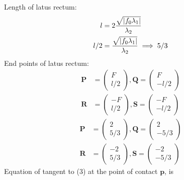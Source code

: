 \documentclass[10pt, a4paper]{article}
\newcommand{\myvec}[1]{\ensuremath{\begin{pmatrix}#1\end{pmatrix}}}
\let\vec\mathbf
\begin{document}
	 Length of latus rectum:
	 \begin{align}
	 l&=2\frac{\sqrt{\abs{f_0\lambda_1}}}{\lambda_2}\\
	  l/2&=\frac{\sqrt{\abs{f_0\lambda_1}}}{\lambda_2}\implies 5/3
	  \end{align} 
End points of latus rectum:
\begin{align}
\vec{P}&=\myvec{F\\l/2},\vec{Q}=\myvec{F\\-l/2}\\\vec{R}&=\myvec{-F\\l/2},\vec{S}=\myvec{-F\\-l/2}
\end{align}
\begin{align}
\vec{P}&=\myvec{2\\5/3},\vec{Q}=\myvec{2\\-5/3}\\\vec{R}&=\myvec{-2\\5/3},\vec{S}=\myvec{-2\\-5/3}
\end{align}
%
Equation of tangent to (3) at the point of contact $\vec{p}$, is 
\end{document}
